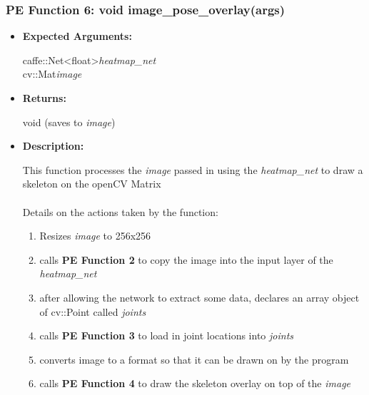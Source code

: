 \documentclass{scrreprt}
\begin{document}
\subsubsection{PE Function 6: void image\_pose\_overlay(args)}
\begin{itemize}
    \item \textbf{Expected Arguments:}

    caffe::Net\textless float\textgreater\quad\textit{heatmap\_net}
    \\
    cv::Mat\quad\textit{image}

    \item \textbf{Returns:}

    void (saves to \textit{image})

    \item \textbf{Description:}

    This function processes the \textit{image} passed in using the \textit{heatmap\_net} to draw a skeleton on the openCV Matrix
    \\\\
    Details on the actions taken by the function:
    \begin{enumerate}
        \item Resizes \textit{image} to 256x256

        \item calls \textbf{PE Function 2} to copy the image into the input layer of the \textit{heatmap\_net}

        \item after allowing the network to extract some data, declares an array object of cv::Point called \textit{joints}

        \item calls \textbf{PE Function 3} to load in joint locations into \textit{joints}

        \item converts image to a format so that it can be drawn on by the program

        \item calls \textbf{PE Function 4} to draw the skeleton overlay on top of the \textit{image}
    \end{enumerate}
\end{itemize}
\end{document}
